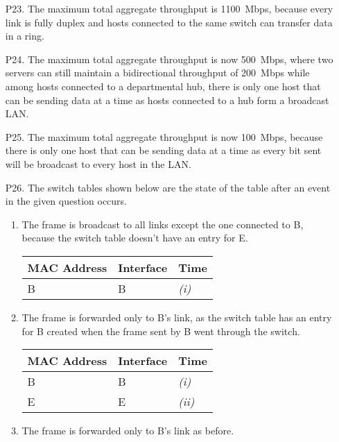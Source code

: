 \documentclass{article}
\begin{document}
\begin{enumerate}
    \item[P23.] The maximum total aggregate throughput is \SI{1100}{Mbps}, because every link is fully duplex and hosts connected to the same switch can transfer data in a ring.

    \item[P24.] The maximum total aggregate throughput is now \SI{500}{Mbps}, where two servers can still maintain a bidirectional throughput of \SI{200}{Mbps} while among hosts connected to a departmental hub, there is only one host that can be sending data at a time as hosts connected to a hub form a broadcast LAN.
 
    \item[P25.] The maximum total aggregate throughput is now \SI{100}{Mbps}, because there is only one host that can be sending data at a time as every bit sent will be broadcast to every host in the LAN.
    
    \item[P26.] The switch tables shown below are the state of the table after an event in the given question occurs.
    \begin{enumerate}[label=\textit{(\roman*)}]
        \item The frame is broadcast to all links except the one connected to B, because the switch table doesn't have an entry for E.
        
        \begin{tabular}{@{}lll@{}}
            \toprule
            MAC Address & Interface & Time \\ \midrule
            B & B & \textit{(i)} \\ \bottomrule
        \end{tabular}

        \item The frame is forwarded only to B's link, as the switch table has an entry for B created when the frame sent by B went through the switch.
        
        \begin{tabular}{@{}lll@{}}
            \toprule
            MAC Address & Interface & Time \\ \midrule
            B & B & \textit{(i)} \\
            E & E & \textit{(ii)} \\ \bottomrule
        \end{tabular}

        \item The frame is forwarded only to B's link as before.
        

\end{enumerate}
\end{enumerate}
\end{document}
